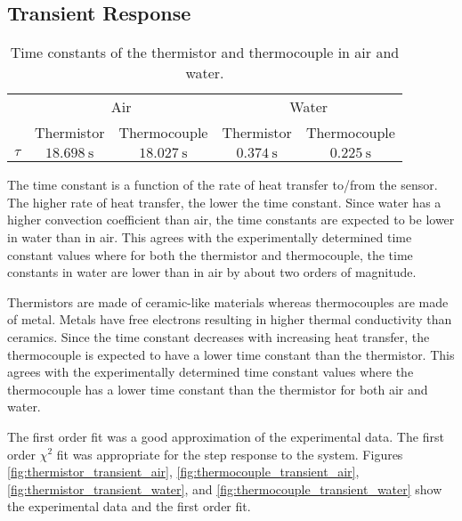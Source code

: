 \subsection{Transient Response}

\begin{table}[h]
    \centering
    \caption{Time constants of the thermistor and thermocouple in air and water.}
    \label{tab:time_constants}
    \begin{tabular}{lcccc}
        \toprule
        & \multicolumn{2}{c}{Air} & \multicolumn{2}{c}{Water} \\
        \cmidrule(lr){2-3} \cmidrule(lr){4-5}
        & Thermistor & Thermocouple & Thermistor & Thermocouple \\
        \midrule
        $\tau$ & $\qty{18.698}{\second}$ & $\qty{18.027}{\second}$ & $\qty{0.374}{\second}$ & $\qty{0.225}{\second}$ \\
        \bottomrule
    \end{tabular}
\end{table}
\noindent The time constant is a function of the rate of heat transfer to/from the sensor. The higher rate of heat transfer, the lower the time constant. 
Since water has a higher convection coefficient than air, the time constants are expected to be lower in water than in air. This agrees with the experimentally 
determined time constant values where for both the thermistor and thermocouple, the time constants in water are lower than in air by about two orders of magnitude.

Thermistors are made of ceramic-like materials whereas thermocouples are made of metal. Metals have free electrons resulting in higher thermal
conductivity than ceramics. Since the time constant decreases with increasing heat transfer, the thermocouple is expected to have a lower time constant than the
thermistor. This agrees with the experimentally determined time constant values where the thermocouple has a lower time constant than the thermistor for
both air and water.

The first order fit was a good approximation of the experimental data. The first order $\chi^2$ fit was appropriate for the step response to the system. 
Figures \ref{fig:thermistor_transient_air}, \ref{fig:thermocouple_transient_air}, \ref{fig:thermistor_transient_water}, and 
\ref{fig:thermocouple_transient_water} show the experimental data and the first order fit. 

